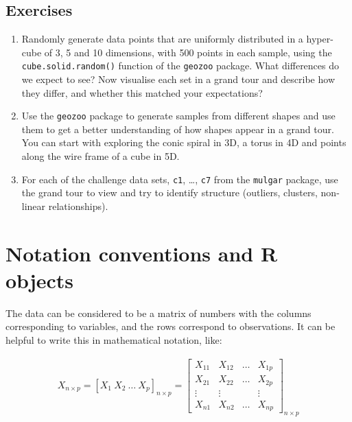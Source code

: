 \documentclass[
  letterpaper,
]{krantz}
\providecommand{\tightlist}{%
  \setlength{\itemsep}{0pt}\setlength{\parskip}{0pt}}\usepackage{longtable,booktabs,array}
\begin{document}
\section*{Exercises}\label{exercises}


\begin{enumerate}
\def\labelenumi{\arabic{enumi}.}
\tightlist
\item
  Randomly generate data points that are uniformly distributed in a
  hyper-cube of 3, 5 and 10 dimensions, with 500 points in each sample,
  using the \texttt{cube.solid.random()} function of the \texttt{geozoo}
  package. What differences do we expect to see? Now visualise each set
  in a grand tour and describe how they differ, and whether this matched
  your expectations?
\item
  Use the \texttt{geozoo} package to generate samples from different
  shapes and use them to get a better understanding of how shapes appear
  in a grand tour. You can start with exploring the conic spiral in 3D,
  a torus in 4D and points along the wire frame of a cube in 5D.
\item
  For each of the challenge data sets, \texttt{c1}, \ldots, \texttt{c7}
  from the \texttt{mulgar} package, use the grand tour to view and try
  to identify structure (outliers, clusters, non-linear relationships).
\end{enumerate}


\chapter{Notation conventions and R
objects}\label{notation-conventions-and-r-objects}

The data can be considered to be a matrix of numbers with the columns
corresponding to variables, and the rows correspond to observations. It
can be helpful to write this in mathematical notation, like:

\begin{eqnarray*}
X_{n\times p} =
[X_1~X_2~\dots~X_p]_{n\times p} = \left[ \begin{array}{cccc}
X_{11} & X_{12} & \dots & X_{1p} \\
X_{21} & X_{22} & \dots & X_{2p}\\
\vdots & \vdots &  & \vdots \\
X_{n1} & X_{n2} & \dots & X_{np} \end{array} \right]_{n\times p}
\end{eqnarray*}
\end{document}

